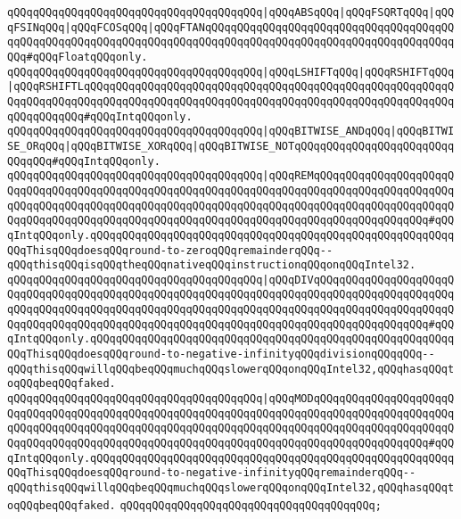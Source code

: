 \verb|qQQqqQQqqQQqqQQqqQQqqQQqqQQqqQQqqQQqqQQq|\verb#|qQQqABSqQQq|qQQqFSQRTqQQq|qQQqFSINqQQq|qQQqFCOSqQQq|qQQqFTANqQQqqQQqqQQqqQQqqQQqqQQqqQQqqQQqqQQqqQQqqQQqqQQqqQQqqQQqqQQqqQQqqQQqqQQqqQQqqQQqqQQqqQQqqQQqqQQqqQQqqQQqqQQqqQQq#\verb|#qQQqFloatqQQqonly.|\newline
\verb|qQQqqQQqqQQqqQQqqQQqqQQqqQQqqQQqqQQqqQQq|\verb#|qQQqLSHIFTqQQq|qQQqRSHIFTqQQq|qQQqRSHIFTLqQQqqQQqqQQqqQQqqQQqqQQqqQQqqQQqqQQqqQQqqQQqqQQqqQQqqQQqqQQqqQQqqQQqqQQqqQQqqQQqqQQqqQQqqQQqqQQqqQQqqQQqqQQqqQQqqQQqqQQqqQQqqQQqqQQqqQQqqQQq#\verb|#qQQqIntqQQqonly.|\newline
\verb|qQQqqQQqqQQqqQQqqQQqqQQqqQQqqQQqqQQqqQQq|\verb#|qQQqBITWISE_ANDqQQq|qQQqBITWISE_ORqQQq|qQQqBITWISE_XORqQQq|qQQqBITWISE_NOTqQQqqQQqqQQqqQQqqQQqqQQqqQQqqQQq#\verb|#qQQqIntqQQqonly.|\newline
\verb|qQQqqQQqqQQqqQQqqQQqqQQqqQQqqQQqqQQqqQQq|\verb#|qQQqREMqQQqqQQqqQQqqQQqqQQqqQQqqQQqqQQqqQQqqQQqqQQqqQQqqQQqqQQqqQQqqQQqqQQqqQQqqQQqqQQqqQQqqQQqqQQqqQQqqQQqqQQqqQQqqQQqqQQqqQQqqQQqqQQqqQQqqQQqqQQqqQQqqQQqqQQqqQQqqQQqqQQqqQQqqQQqqQQqqQQqqQQqqQQqqQQqqQQqqQQqqQQqqQQqqQQqqQQqqQQqqQQqqQQq#\verb|#qQQqIntqQQqonly.qQQqqQQqqQQqqQQqqQQqqQQqqQQqqQQqqQQqqQQqqQQqqQQqqQQqqQQqqQQqThisqQQqdoesqQQqround-to-zeroqQQqremainderqQQq--qQQqthisqQQqisqQQqtheqQQqnativeqQQqinstructionqQQqonqQQqIntel32.|\newline
\verb|qQQqqQQqqQQqqQQqqQQqqQQqqQQqqQQqqQQqqQQq|\verb#|qQQqDIVqQQqqQQqqQQqqQQqqQQqqQQqqQQqqQQqqQQqqQQqqQQqqQQqqQQqqQQqqQQqqQQqqQQqqQQqqQQqqQQqqQQqqQQqqQQqqQQqqQQqqQQqqQQqqQQqqQQqqQQqqQQqqQQqqQQqqQQqqQQqqQQqqQQqqQQqqQQqqQQqqQQqqQQqqQQqqQQqqQQqqQQqqQQqqQQqqQQqqQQqqQQqqQQqqQQqqQQqqQQqqQQqqQQq#\verb|#qQQqIntqQQqonly.qQQqqQQqqQQqqQQqqQQqqQQqqQQqqQQqqQQqqQQqqQQqqQQqqQQqqQQqqQQqThisqQQqdoesqQQqround-to-negative-infinityqQQqdivisionqQQqqQQq--qQQqthisqQQqwillqQQqbeqQQqmuchqQQqslowerqQQqonqQQqIntel32,qQQqhasqQQqtoqQQqbeqQQqfaked.|\newline
\verb|qQQqqQQqqQQqqQQqqQQqqQQqqQQqqQQqqQQqqQQq|\verb#|qQQqMODqQQqqQQqqQQqqQQqqQQqqQQqqQQqqQQqqQQqqQQqqQQqqQQqqQQqqQQqqQQqqQQqqQQqqQQqqQQqqQQqqQQqqQQqqQQqqQQqqQQqqQQqqQQqqQQqqQQqqQQqqQQqqQQqqQQqqQQqqQQqqQQqqQQqqQQqqQQqqQQqqQQqqQQqqQQqqQQqqQQqqQQqqQQqqQQqqQQqqQQqqQQqqQQqqQQqqQQqqQQqqQQqqQQq#\verb|#qQQqIntqQQqonly.qQQqqQQqqQQqqQQqqQQqqQQqqQQqqQQqqQQqqQQqqQQqqQQqqQQqqQQqqQQqThisqQQqdoesqQQqround-to-negative-infinityqQQqremainderqQQq--qQQqthisqQQqwillqQQqbeqQQqmuchqQQqslowerqQQqonqQQqIntel32,qQQqhasqQQqtoqQQqbeqQQqfaked.|\newline
\verb|qQQqqQQqqQQqqQQqqQQqqQQqqQQqqQQqqQQqqQQq;|\newline
